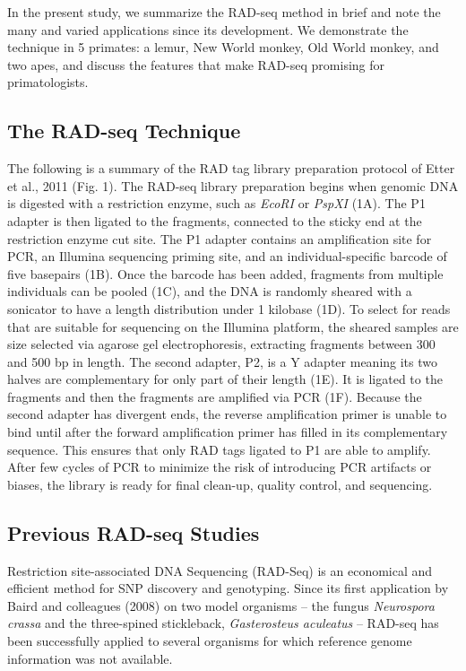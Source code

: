 \documentclass[12pt]{article}
\begin{document}
In the present study, we summarize the RAD-seq method in brief and note the many and varied applications since its development. We demonstrate the technique in 5 primates: a lemur, New World monkey, Old World monkey, and two apes, and discuss the features that make RAD-seq promising for primatologists.  

\subsection{The RAD-seq Technique}

The following is a summary of the RAD tag library preparation protocol of Etter et al., 2011 (Fig. 1). The RAD-seq library preparation begins when genomic DNA is digested with a restriction enzyme, such as \emph{EcoRI} or \emph{PspXI} (1A). The P1 adapter is then ligated to the fragments, connected to the sticky end at the restriction enzyme cut site. The P1 adapter contains an amplification site for PCR, an Illumina sequencing priming site, and an individual-specific barcode of five basepairs (1B). Once the barcode has been added, fragments from multiple individuals can be pooled (1C), and the DNA is randomly sheared with a sonicator to have a length distribution under 1 kilobase (1D). To select for reads that are suitable for sequencing on the Illumina platform, the sheared samples are size selected via agarose gel electrophoresis, extracting fragments between 300 and 500 bp in length. The second adapter, P2, is a Y adapter meaning its two halves are complementary for only part of their length (1E). It is ligated to the fragments and then the fragments are amplified via PCR (1F). Because the second adapter has divergent ends, the reverse amplification primer is unable to bind until after the forward amplification primer has filled in its complementary sequence. This ensures that only RAD tags ligated to P1 are able to amplify. After few cycles of PCR to minimize the risk of introducing PCR artifacts or biases, the library is ready for final clean-up, quality control, and sequencing.

\subsection{Previous RAD-seq Studies}

Restriction site-associated DNA Sequencing (RAD-Seq) is an economical and efficient method for SNP discovery and genotyping. Since its first application by Baird and colleagues (2008) on two model organisms – the fungus \emph{Neurospora crassa} and the three-spined stickleback, \emph{Gasterosteus aculeatus} – RAD-seq has been successfully applied to several organisms for which reference genome information was not available. 
\end{document}
